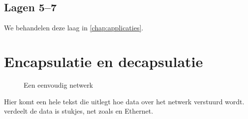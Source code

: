 \subsection{Lagen 5--7}
We behandelen deze laag in \cref{chap:applicaties}.




\section{Encapsulatie en decapsulatie}
\begin{figure}
    \centering
    
    \caption{Een eenvoudig netwerk}
    \label{fig:simpel-netwerk}
\end{figure}

Hier komt een hele tekst die uitlegt hoe data over het netwerk verstuurd wordt.
 verdeelt de data is stukjes, net zoals  en Ethernet.